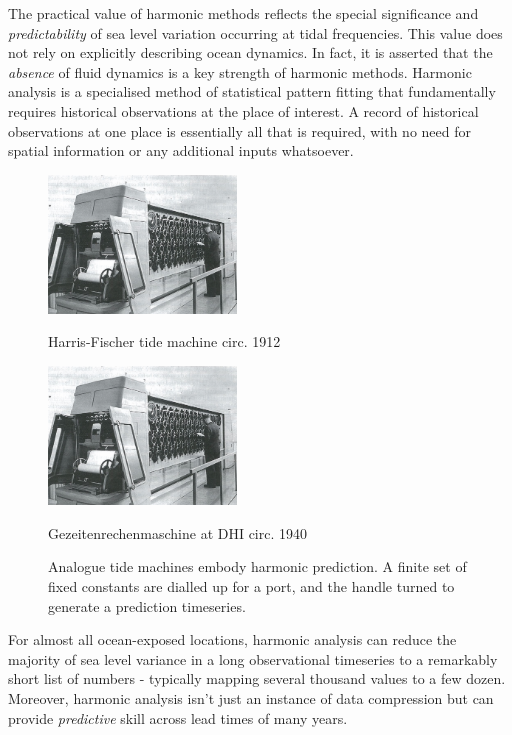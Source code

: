 The practical value of harmonic methods reflects the special significance and \emph{predictability} of sea level variation occurring at tidal frequencies.  This value does not rely on explicitly describing ocean dynamics.  In fact, it is asserted that the \emph{absence} of fluid dynamics is a key strength of harmonic methods.   Harmonic analysis is a specialised method of statistical pattern fitting that fundamentally requires historical observations at the place of interest.   A record of historical observations at one place is essentially all that is required, with no need for spatial information or any additional inputs whatsoever. 



\begin{figure}[!h]
	\centering
	\includegraphics[width=50mm]{figures/images/DHI_machine_cartwright_fig11p2.png}
	\caption{Harris-Fischer tide machine circ. 1912 }
	\qquad
    \includegraphics[width=50mm]{figures/images/DHI_machine_cartwright_fig11p2.png}
	\caption{Gezeitenrechenmaschine at DHI circ. 1940 }
	\caption{Analogue tide machines embody harmonic prediction.  A finite set of fixed constants are dialled up for a port, and the handle turned to generate a prediction timeseries.}
	\label{fig:tide_machines}
\end{figure}


For almost all ocean-exposed locations, harmonic analysis can reduce the majority of sea level variance in a long observational timeseries to a remarkably short list of numbers - typically mapping several thousand values to a few dozen\citep{Flinchem:2000kp}.  Moreover, harmonic analysis isn't just an instance of data compression but can provide \emph{predictive} skill across lead times of many years.\\



